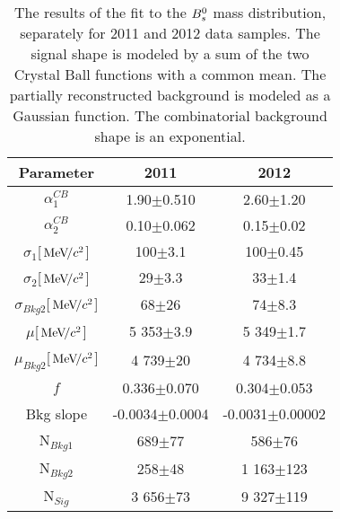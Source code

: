\begin{table}[hb]
  \caption{
    The results of the fit to the ${{B}^0_{s}}$ mass distribution, separately for 2011 and 2012 data samples. The signal shape is modeled by a sum of the two Crystal Ball functions with a common mean. The partially reconstructed background is modeled as a Gaussian function. The combinatorial background shape is an exponential.
}
\small{
\begin{center} \begin{tabular}{|c|c|c|}
   \hline
      Parameter & 2011 & 2012  \\
    \hline
   $\alpha^{CB}_{1}$ & 1.90$\pm$0.510 & 2.60$\pm$1.20\\
   $\alpha^{CB}_{2}$ & 0.10$\pm$0.062 & 0.15$\pm$0.02\\
   $\sigma_{1}$[${\mathrm{\,Me\kern -0.1em V\!/}c^2}$] & 100$\pm$3.1 & 100$\pm$0.45  \\
   $\sigma_{2}$[${\mathrm{\,Me\kern -0.1em V\!/}c^2}$] & 29$\pm$3.3 & 33$\pm$1.4  \\
   $\sigma_{Bkg2}$[${\mathrm{\,Me\kern -0.1em V\!/}c^2}$] & 68$\pm$26 & 74$\pm$8.3  \\
   $\mu$[${\mathrm{\,Me\kern -0.1em V\!/}c^2}$] & 5 353$\pm$3.9 & 5 349$\pm$1.7 \\
   $\mu_{Bkg2}$[${\mathrm{\,Me\kern -0.1em V\!/}c^2}$] & 4 739$\pm$20 & 4 734$\pm$8.8  \\
   $f$ & 0.336$\pm$0.070 & 0.304$\pm$0.053  \\
   Bkg slope & -0.0034$\pm$0.0004 & -0.0031$\pm$0.00002 \\
   N$_{Bkg1}$ & 689$\pm$77 & 586$\pm$76  \\
   N$_{Bkg2}$ & 258$\pm$48 & 1 163$\pm$123 \\
   N$_{Sig}$ & 3 656$\pm$73 & 9 327$\pm$119 \\
  \hline
    \end{tabular}\end{center}
  }
\label{tab:BsTable}
\end{table}
